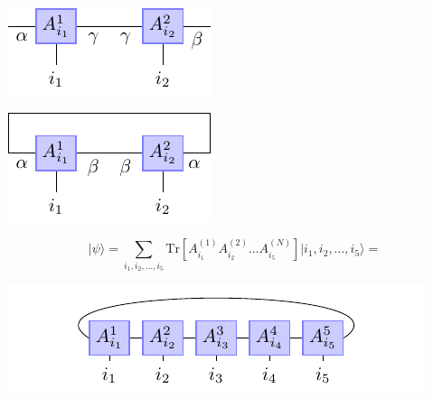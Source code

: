 \documentclass[a0,portrait]{a0poster}
\newcommand{\ket}[1]{\vert #1 \rangle}
\newcommand{\Tr}{\mathrm{Tr}}
\begin{document}
\begin{multicols}{2}
\begin{minipage}[m]{0.45\linewidth}
	\centering
	\includegraphics[width=0.6\linewidth]{mps-vertex-product}
	\label{fig:mps-vertex-product}
\end{minipage}
\begin{minipage}[m]{0.45\linewidth}
	\centering
	\includegraphics[width=0.6\linewidth]{mps-vertex-product-trace}
	\label{fig:mps-vertex-product-trace}
\end{minipage}

\begin{minipage}[m]{0.3\columnwidth}
	$$ \ket{\psi} = \sum_{i_1, i_2, \ldots, i_5} \Tr\left[ A^{(1)}_{i_1} A^{(2)}_{i_2} \ldots A^{(N)}_{i_5} \right] \ket{i_1, i_2, \ldots, i_5} = $$
\end{minipage}
\begin{minipage}[m]{0.4\columnwidth}
	\hspace*{8cm}\includegraphics[width=1.0\linewidth]{mps-state}
\end{minipage}


\end{multicols}
\end{document}
